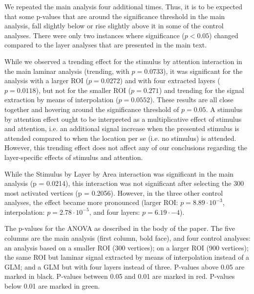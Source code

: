 \documentclass[9pt,lineno]{aperture}
\begin{document}
\begin{appendixbox}
We repeated the main analysis four additional times. Thus, it is to be expected that some p-values that are around the significance threshold in the main analysis, fall slightly below or rise slightly above it in some of the control analyses. There were only two instances where significance ($p < 0.05$) changed compared to the layer analyses that are presented in the main text. 

While we observed a trending effect for the stimulus by attention interaction in the main laminar analysis (trending, with $p=0.0733$), it was significant for the analysis with a larger ROI ($p=0.0272$) and with four extracted layers ($p=0.0118$), but not for the smaller ROI ($p=0.271$) and trending for the signal extraction by means of interpolation ($p=0.0552$). These results are all close together and hovering around the significance threshold of $p=0.05$. A stimulus by attention effect ought to be interpreted as a multiplicative effect of stimulus and attention, i.e. an additional signal increase when the presented stimulus is attended compared to when the location per se (i.e. no stimulus) is attended. However, this trending effect does not affect any of our conclusions regarding the layer-specific effects of stimulus and attention. 

While the Stimulus by Layer by Area interaction was significant in the main analysis (p = 0.0214), this interaction was not significant after selecting the 300 most activated vertices (p = 0.2056). However, in the three other control analyses, the effect became more pronounced (larger ROI: $p=8.89\cdot10^{-3}$, interpolation: $p=2.78\cdot10^{-5}$, and four layers: $p=6.19\cdot{-4}$). 
\end{appendixbox}


\begin{table}
\caption{The p-values for the ANOVA as described in the body of the paper. The five columns are the main analysis (first column, bold face), and four control analyses: an analysis based on a smaller ROI (300 vertices); on a larger ROI (900 vertices); the same ROI but laminar signal extracted by means of interpolation instead of a GLM; and a GLM but with four layers instead of three. P-values above 0.05 are marked in black. P-values between 0.05 and 0.01 are marked in red. P-values below 0.01 are marked in green.}
\label{TABLE:control-analyses}
\hspace*{-14em}

\end{table}
\end{document}
